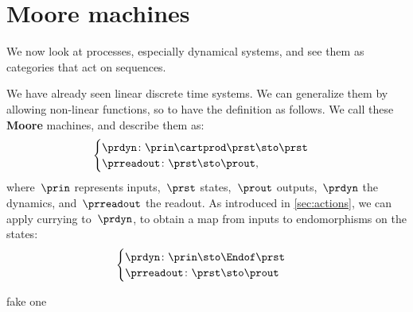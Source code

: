 
\section{Moore machines}


We now look at processes, especially dynamical systems, and see them as categories that act on sequences.

We have already seen linear discrete time systems. We can generalize them by allowing non-linear functions, so to have
the definition as follows. We call these \textbf{Moore} machines, and describe them as:
\begin{equation}\label{eq:moore-1}
    \begin{cases}
    \prdyn \colon \prin \cartprod \prst \sto \prst \\
    \prreadout \colon \prst \sto \prout,
    \end{cases}
\end{equation}
where~$\prin$ represents inputs,~$\prst$ states,~$\prout$ outputs,~$\prdyn$ the dynamics, and~$\prreadout$ the readout.
As introduced in \cref{sec:actions}, we can apply currying to~$\prdyn$, to obtain a map from inputs to endomorphisms on the states:
\begin{equation}\label{eq:moore-1-endo}
  \begin{cases}
  \prdyn \colon \prin \sto \Endof \prst \\
  \prreadout \colon \prst \sto \prout
  \end{cases}
\end{equation}

\begin{exercise}
fake one
\end{exercise}
\begin{solution}
\end{solution}


